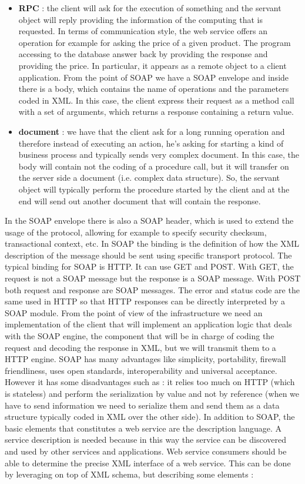\begin{itemize}
    \item \textbf{RPC} : the client will ask for the execution of something and the servant object will reply providing the information of the computing that is requested. In terms of communication style, the web service offers an operation for example for asking the price of a given product. The program accessing to the database answer back by providing the response and providing the price. In particular, it appears as a remote object to a client application. From the point of SOAP we have a SOAP envelope and inside there is a body, which contains the name of operations and the parameters coded in XML. In this case, the client express their request as a method  call with a set of arguments, which returns a response containing a return value.
    \item \textbf{document} : we have that the client ask for a long running operation and therefore instead of executing an action, he's asking for starting a kind of business process and typically sends very complex document. In this case, the body will contain not the coding of a procedure call, but it will transfer on the server side a document (i.e. complex data structure). So, the servant object will typically perform the procedure started by the client and at the end will send out another document that will contain the response.
\end{itemize}
In the SOAP envelope there is also a SOAP header, which is used to extend the usage of the protocol, allowing for example to specify security checksum, transactional context, etc. In SOAP the binding is the definition of how the XML description of the message should be sent using specific transport protocol. The typical binding for SOAP is HTTP. It can use GET and POST. With GET, the request is not a SOAP message but the response is a SOAP message. With POST both request and response are SOAP messages. The error and status code are the same used in HTTP so that HTTP responses can be directly interpreted by a SOAP module. From the point of view of the infrastructure we need an implementation of the client that will implement an application logic that deals with the SOAP engine, the component that will be in charge of coding the request and decoding the response in XML, but we will transmit them to a HTTP engine. SOAP has many advantages like simplicity, portability, firewall friendliness, uses open standards, interoperability and universal acceptance. However it has some disadvantages such as : it relies too much on HTTP (which is stateless) and perform the serialization by value and not by reference (when we have to send information we need to serialize them and send them as a data structure typically coded in XML over  the other side). In addition to SOAP, the basic elements that constitutes a web service are the description language. A service description is needed because in this way the service can be discovered and used by other services and applications. Web service consumers should be able to determine the precise XML interface of a web service. This can be done by leveraging on top of XML schema, but describing some elements :
